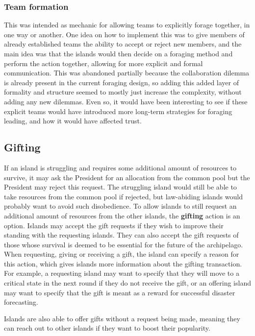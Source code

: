 \subsubsection{Team formation}
This was intended as mechanic for allowing teams to explicitly forage together, in one way or another. One idea on how to implement this was to give members of already established teams the ability to accept or reject new members, and the main idea was that the islands would then decide on a foraging method and perform the action together, allowing for more explicit and formal communication. This was abandoned partially because the collaboration dilemma is already present in the current foraging design, so adding this added layer of formality and structure seemed to mostly just increase the complexity, without adding any new dilemmas. Even so, it would have been interesting to see if these explicit teams would have introduced more long-term strategies for foraging leading, and how it would have affected trust.

\subsection{Gifting}  
\label{subsec:IITO:gifting}  

If an island is struggling and requires some additional amount of resources to survive, it may ask the President for an allocation from the common pool but the President may reject this request. The struggling island would still be able to take resources from the common pool if rejected, but law-abiding islands would probably want to avoid such disobedience. To allow islands to still request an additional amount of resources from the other islands, the \textbf{gifting} action is an option. Islands may accept the gift requests if they wish to improve their standing with the requesting islands. They can also accept the gift requests of those whose survival is deemed to be essential for the future of the archipelago. When requesting, giving or receiving a gift, the island can specify a reason for this action, which gives islands more information about the gifting transaction. For example, a requesting island may want to specify that they will move to a critical state in the next round if they do not receive the gift, or an offering island may want to specify that the gift is meant as a reward for successful disaster forecasting.

Islands are also able to offer gifts without a request being made, meaning they can reach out to other islands if they want to boost their popularity.

